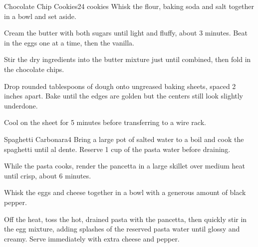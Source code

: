 \documentclass[4x6]{recipecard}
\begin{document}
\begin{recipe}{Chocolate Chip Cookies}{24 cookies}
Whisk the flour, baking soda and salt together in a bowl and set aside.

Cream the butter with both sugars until light and fluffy, about 3 minutes.
Beat in the eggs one at a time, then the vanilla.

Stir the dry ingredients into the butter mixture just until combined, then
fold in the chocolate chips.

Drop rounded tablespoons of dough onto ungreased baking sheets, spaced
2 inches apart. Bake until the edges are golden but the centers still
look slightly underdone.

Cool on the sheet for 5 minutes before transferring to a wire rack.
\end{recipe}

\begin{recipe}{Spaghetti Carbonara}{4}
Bring a large pot of salted water to a boil and cook the spaghetti until
al dente. Reserve 1 cup of the pasta water before draining.

While the pasta cooks, render the pancetta in a large skillet over medium
heat until crisp, about 6 minutes.

Whisk the eggs and cheese together in a bowl with a generous amount of
black pepper.

Off the heat, toss the hot, drained pasta with the pancetta, then quickly
stir in the egg mixture, adding splashes of the reserved pasta water until
glossy and creamy. Serve immediately with extra cheese and pepper.
\end{recipe}
\end{document}
